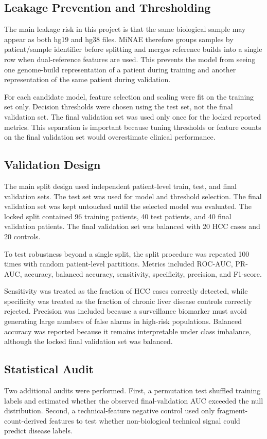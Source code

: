 \documentclass[conference]{IEEEtran}
\begin{document}
\subsection{Leakage Prevention and Thresholding}
The main leakage risk in this project is that the same biological sample may appear as both hg19 and hg38 files. MiNAE therefore groups samples by patient/sample identifier before splitting and merges reference builds into a single row when dual-reference features are used. This prevents the model from seeing one genome-build representation of a patient during training and another representation of the same patient during validation.

For each candidate model, feature selection and scaling were fit on the training set only. Decision thresholds were chosen using the test set, not the final validation set. The final validation set was used only once for the locked reported metrics. This separation is important because tuning thresholds or feature counts on the final validation set would overestimate clinical performance.

\subsection{Validation Design}
The main split design used independent patient-level train, test, and final validation sets. The test set was used for model and threshold selection. The final validation set was kept untouched until the selected model was evaluated. The locked split contained 96 training patients, 40 test patients, and 40 final validation patients. The final validation set was balanced with 20 HCC cases and 20 controls.

To test robustness beyond a single split, the split procedure was repeated 100 times with random patient-level partitions. Metrics included ROC-AUC, PR-AUC, accuracy, balanced accuracy, sensitivity, specificity, precision, and F1-score.

Sensitivity was treated as the fraction of HCC cases correctly detected, while specificity was treated as the fraction of chronic liver disease controls correctly rejected. Precision was included because a surveillance biomarker must avoid generating large numbers of false alarms in high-risk populations. Balanced accuracy was reported because it remains interpretable under class imbalance, although the locked final validation set was balanced.

\subsection{Statistical Audit}
Two additional audits were performed. First, a permutation test shuffled training labels and estimated whether the observed final-validation AUC exceeded the null distribution. Second, a technical-feature negative control used only fragment-count-derived features to test whether non-biological technical signal could predict disease labels.
\end{document}
